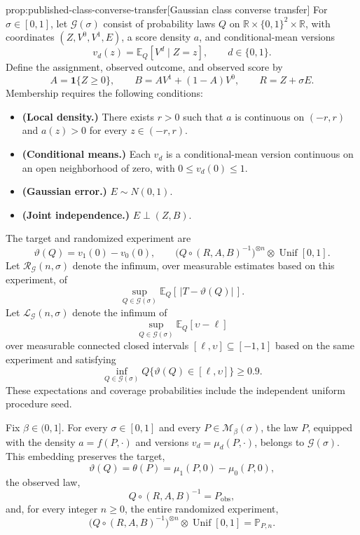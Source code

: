 \begin{propositionv}{prop:published-class-converse-transfer}[Gaussian class converse transfer]
For \(\sigma\in[0,1]\), let \(\mathcal G(\sigma)\) consist of probability laws \(Q\) on \(\mathbb R\times\{0,1\}^2\times\mathbb R\), with coordinates \((Z,V^0,V^1,E)\), a score density \(a\), and conditional-mean versions
\[
v_d(z)=\mathbb E_Q[V^d\mid Z=z],\qquad d\in\{0,1\}.
\]
Define the assignment, observed outcome, and observed score by
\[
A=\mathbf 1\{Z\ge0\},\qquad
B=AV^1+(1-A)V^0,\qquad
R=Z+\sigma E.
\]
Membership requires the following conditions:
\begin{itemize}
\item \textbf{(Local density.)} There exists \(r>0\) such that \(a\) is continuous on \((-r,r)\) and \(a(z)>0\) for every \(z\in(-r,r)\).
\item \textbf{(Conditional means.)} Each \(v_d\) is a conditional-mean version continuous on an open neighborhood of zero, with \(0\le v_d(0)\le1\).
\item \textbf{(Gaussian error.)} \(E\sim N(0,1)\).
\item \textbf{(Joint independence.)} \(E\perp(Z,B)\).
\end{itemize}
The target and randomized experiment are
\[
\vartheta(Q)=v_1(0)-v_0(0),\qquad
\bigl(Q\circ(R,A,B)^{-1}\bigr)^{\otimes n}
 \otimes\operatorname{Unif}[0,1].
\]
Let \(\mathcal R_{\mathcal G}(n,\sigma)\) denote the infimum, over measurable estimates based on this experiment, of
\[
\sup_{Q\in\mathcal G(\sigma)}
\mathbb E_Q\!\left[\,|T-\vartheta(Q)|\,\right].
\]
Let \(\mathcal L_{\mathcal G}(n,\sigma)\) denote the infimum of
\[
\sup_{Q\in\mathcal G(\sigma)}
\mathbb E_Q[\upsilon-\ell]
\]
over measurable connected closed intervals \([\ell,\upsilon]\subseteq[-1,1]\) based on the same experiment and satisfying
\[
\inf_{Q\in\mathcal G(\sigma)}
Q\{\vartheta(Q)\in[\ell,\upsilon]\}\ge0.9.
\]
These expectations and coverage probabilities include the independent uniform procedure seed.

Fix \(\beta\in(0,1]\). For every \(\sigma\in[0,1]\) and every \(P\in\mathcal M_\beta(\sigma)\), the law \(P\), equipped with the density \(a=f(P,\cdot)\) and versions \(v_d=\mu_d(P,\cdot)\), belongs to \(\mathcal G(\sigma)\). This embedding preserves the target,
\[
\vartheta(Q)=\theta(P)
=\mu_1(P,0)-\mu_0(P,0),
\]
the observed law,
\[
Q\circ(R,A,B)^{-1}=P_{\mathrm{obs}},
\]
and, for every integer \(n\ge0\), the entire randomized experiment,
\[
\bigl(Q\circ(R,A,B)^{-1}\bigr)^{\otimes n}
 \otimes\operatorname{Unif}[0,1]
=\mathbb P_{P,n}.
\]


\end{propositionv}
